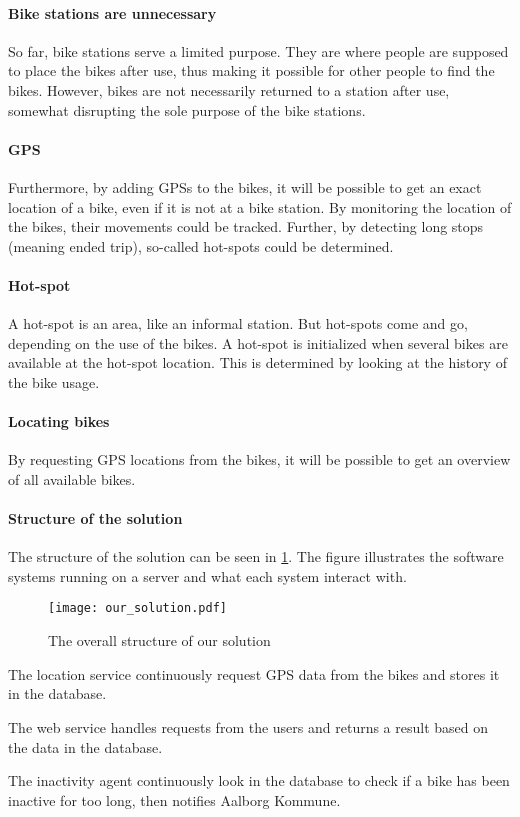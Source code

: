 \paragraph{Bike stations are unnecessary}
So far, bike stations serve a limited purpose.
They are where people are supposed to place the bikes after use, thus making it possible for other people to find the bikes.
However, bikes are not necessarily returned to a station after use, somewhat disrupting the sole purpose of the bike stations.

\paragraph{GPS}
Furthermore, by adding GPSs to the bikes, it will be possible to get an exact location of a bike, even if it is not at a bike station.
By monitoring the location of the bikes, their movements could be tracked.
Further, by detecting long stops (meaning ended trip), so-called hot-spots could be determined.

\paragraph{Hot-spot}
A hot-spot is an area, like an informal station.
But hot-spots come and go, depending on the use of the bikes.
A hot-spot is initialized when several bikes are available at the hot-spot location.
This is determined by looking at the history of the bike usage.

\paragraph{Locating bikes}
By requesting GPS locations from the bikes, it will be possible to get an overview of all available bikes.

\paragraph{Structure of the solution}
The structure of the solution can be seen in \cref{fig:solution_structure}.
The figure illustrates the software systems running on a server and what each system interact with.
 
\begin{figure}[h]
\texttt{[image: our\_solution.pdf]}
\caption{The overall structure of our solution}
\label{fig:solution_structure}
\end{figure}

The location service continuously request GPS data from the bikes and stores it in the database.

The web service handles requests from the users and returns a result based on the data in the database.

The inactivity agent continuously look in the database to check if a bike has been inactive for too long, then notifies Aalborg Kommune.